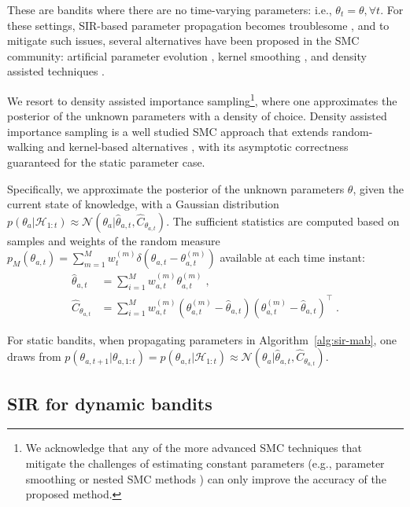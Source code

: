 \documentclass{article}
\newcommand{\HH}{\mathcal{H}}
\newcommand{\ie}{i.e., }
\newcommand{\eg}{e.g., }
\newcommand{\N}[1]{\mathcal{N}\left( #1\right)}
\begin{document}
These are bandits where there are no time-varying parameters: \ie $\theta_t=\theta, \forall t$. For these settings, SIR-based parameter propagation becomes troublesome \cite{b-Liu2001}, and to mitigate such issues, several alternatives have been proposed in the SMC community: artificial parameter evolution \cite{j-Gordon1993}, kernel smoothing \cite{b-Liu2001}, and density assisted techniques \cite{ip-Djuric2004}.

We resort to density assisted importance sampling\footnote{We acknowledge that any of the more advanced SMC techniques that mitigate the challenges of estimating constant parameters (\eg parameter smoothing \cite{j-Carvalho2010,j-Olsson2006,j-Olsson2014} or nested SMC methods \cite{j-Chopin2011,j-Crisan2013}) can only improve the accuracy of the proposed method.}, where one approximates the posterior of the unknown parameters with a density of choice. Density assisted importance sampling is a well studied SMC approach that extends random-walking and kernel-based alternatives \cite{j-Gordon1993, ib-Liu2001, ip-Djuric2004}, with its asymptotic correctness guaranteed for the static parameter case.

Specifically, we approximate the posterior of the unknown parameters $\theta$, given the current state of knowledge, with a Gaussian distribution $p(\theta_a|\HH_{1:t}) \approx \N{\theta_a|\hat{\theta}_{a,t}, \hat{C}_{\theta_{a,t}}}$. The sufficient statistics are computed based on samples and weights of the random measure $p_M(\theta_{a,t})=\sum_{m=1}^M w_{t}^{(m)} \delta\left(\theta_{a,t}-\theta_{a,t}^{(m)}\right)$ available at each time instant:
\begin{equation}
\begin{split}
\hat{\theta}_{a,t} &= \sum_{i=1}^{M} w_{a,t}^{(m)} \theta^{(m)}_{a,t} \;,  \\
\hat{C}_{\theta_{a,t}} &= \sum_{i=1}^{M} w_{a,t}^{(m)}(\theta^{(m)}_{a,t} - \hat{\theta}_{a,t})(\theta^{(m)}_{a,t} - \hat{\theta}_{a,t})^\top \;.
\end{split}
\label{eq:proposedMethod_unknownAB_DA_estSuffStatistics}
\end{equation}

For static bandits, when propagating parameters in Algorithm~\ref{alg:sir-mab}, one draws from $p(\theta_{a,t+1}|\theta_{a,1:t})=p(\theta_{a,t}|\HH_{1:t}) \approx \N{\theta_a|\hat{\theta}_{a,t}, \hat{C}_{\theta_{a,t}}}$.

\subsection{SIR for dynamic bandits}
\label{ssec:linear_mixing_dynamics}
\end{document}
